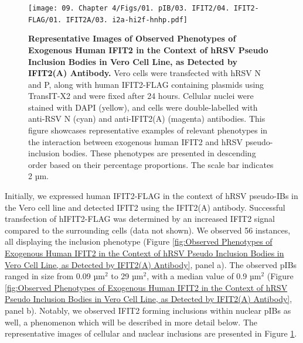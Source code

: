 \begin{figure}
    \centering
    \texttt{[image: 09. Chapter 4/Figs/01. pIB/03. IFIT2/04. IFIT2-FLAG/01. IFIT2A/03. i2a-hi2f-hnhp.pdf]}
    \caption[Representative Images of Observed Phenotypes of Exogenous Human IFIT2 in the Context of hRSV Pseudo Inclusion Bodies in Vero Cell Line, as Detected by IFIT2(A) Antibody.]{\textbf{Representative Images of Observed Phenotypes of Exogenous Human IFIT2 in the Context of hRSV Pseudo Inclusion Bodies in Vero Cell Line, as Detected by IFIT2(A) Antibody.} Vero cells were transfected with hRSV N and P, along with human IFIT2-FLAG containing plasmids using TransIT-X2 and were fixed after 24 hours. Cellular nuclei were stained with DAPI (yellow), and cells were double-labelled with anti-RSV N (cyan) and anti-IFIT2(A) (magenta) antibodies. This figure showcases representative examples of relevant phenotypes in the interaction between exogenous human IFIT2 and hRSV pseudo-inclusion bodies. These phenotypes are presented in descending order based on their percentage proportions. The scale bar indicates 2 µm.}
    \label{fig:Representative Images of Observed Phenotypes of Exogenous Human IFIT2 in the Context of hRSV Pseudo Inclusion Bodies in Vero Cell Line, as Detected by IFIT2(A) Antibody}
\end{figure}

Initially, we expressed human IFIT2-FLAG in the context of hRSV pseudo-IBs in the Vero cell line and detected IFIT2 using the IFIT2(A) antibody. Successful transfection of hIFIT2-FLAG was determined by an increased IFIT2 signal compared to the surrounding cells (data not shown). We observed 56 instances, all displaying the inclusion phenotype (Figure \ref{fig:Observed Phenotypes of Exogenous Human IFIT2 in the Context of hRSV Pseudo Inclusion Bodies in Vero Cell Line, as Detected by IFIT2(A) Antibody}, panel a). The observed pIBs ranged in size from 0.09 \(\mbox{µm}^2\) to 29 \(\mbox{µm}^2\), with a median value of 0.9 \(\mbox{µm}^2\) (Figure \ref{fig:Observed Phenotypes of Exogenous Human IFIT2 in the Context of hRSV Pseudo Inclusion Bodies in Vero Cell Line, as Detected by IFIT2(A) Antibody}, panel b). Notably, we observed IFIT2 forming inclusions within nuclear pIBs as well, a phenomenon which will be described in more detail below. The representative images of cellular and nuclear inclusions are presented in Figure \ref{fig:Representative Images of Observed Phenotypes of Exogenous Human IFIT2 in the Context of hRSV Pseudo Inclusion Bodies in Vero Cell Line, as Detected by IFIT2(A) Antibody}.

